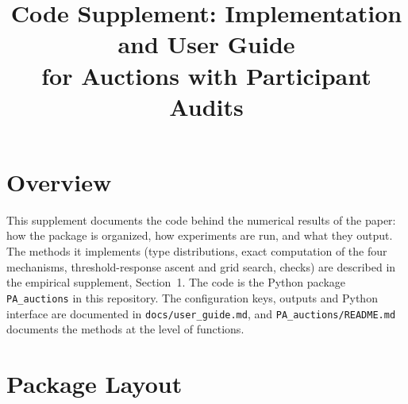 \documentclass[11pt]{article}
\title{Code Supplement: Implementation and User Guide\\for Auctions with Participant Audits}
\author{}
\date{}
\newcommand{\code}[1]{\texttt{#1}}
\begin{document}
\maketitle

\section{Overview}\label{sec:overview}

This supplement documents the code behind the numerical results of the paper: how the package is organized, how experiments are run, and what they output. The methods it implements (type distributions, exact computation of the four mechanisms, threshold-response ascent and grid search, checks) are described in the empirical supplement, Section~1. The code is the Python package \code{PA\_auctions} in this repository. The configuration keys, outputs and Python interface are documented in \code{docs/user\_guide.md}, and \code{PA\_auctions/README.md} documents the methods at the level of functions.

\section{Package Layout}\label{sec:layout}
\end{document}
